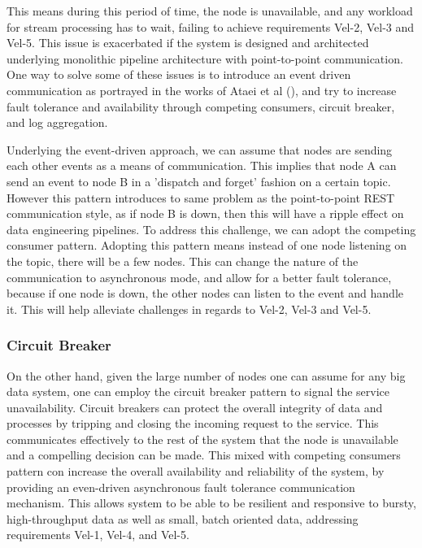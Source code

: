\documentclass[conference]{IEEEtran}
\begin{document}
This means during this period of time, the node is unavailable, and any workload for stream processing has to wait, failing to achieve requirements Vel-2, Vel-3 and Vel-5. This issue is exacerbated if the system is designed and architected underlying monolithic pipeline architecture with point-to-point communication. One way to solve some of these issues is to introduce an event driven communication as portrayed in the works of Ataei et al (\cite{ataei2021neomycelia}), and try to increase fault tolerance and availability through competing consumers, circuit breaker, and log aggregation. 

Underlying the event-driven approach, we can assume that nodes are sending each other events as a means of communication. This implies that node A can send an event to node B in a 'dispatch and forget' fashion on a certain topic. However this pattern introduces to same problem as the point-to-point REST communication style, as if node B is down, then this will have a ripple effect on data engineering pipelines. To address this challenge, we can adopt the competing consumer pattern. Adopting this pattern means instead of one node listening on the topic, there will be a few nodes. This can change the nature of the communication to asynchronous mode, and allow for a better fault tolerance, because if one node is down, the other nodes can listen to the event and handle it. This will help alleviate challenges in regards to Vel-2, Vel-3 and Vel-5.

\subsubsection{Circuit Breaker}

On the other hand, given the large number of nodes one can assume for any big data system, one can employ the circuit breaker pattern to signal the service unavailability. Circuit breakers can protect the overall integrity of data and processes by tripping and closing the incoming request to the service. This communicates effectively to the rest of the system that the node is unavailable and a compelling decision can be made. This mixed with competing consumers pattern con increase the overall availability and reliability of the system, by providing an even-driven asynchronous fault tolerance communication mechanism. This allows system to be able to be resilient and responsive to bursty, high-throughput data as well as small, batch oriented data, addressing requirements Vel-1, Vel-4, and Vel-5. 
    
\end{document}
